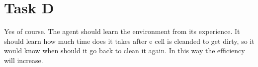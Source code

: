 
\section{Task D}
Yes of course. The agent should learn the environment from its experience. It
should learn how much time does it takes after e cell is cleanded to get dirty,
so it would know when should it go back to clean it again. In this way the
efficiency will increase.

